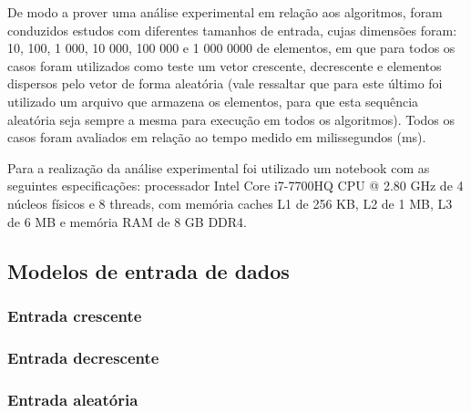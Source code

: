 \documentclass[conference]{IEEEtran}
\begin{document}
De modo a prover uma análise experimental em relação aos algoritmos, foram conduzidos estudos com diferentes tamanhos de entrada, cujas dimensões foram: 10, 100, 1 000, 10 000, 100 000 e 1 000 0000 de elementos, em que para todos os casos foram utilizados como teste um vetor crescente, decrescente e elementos dispersos pelo vetor de forma aleatória (vale ressaltar que para este último foi utilizado um arquivo que armazena os elementos, para que esta sequência aleatória seja sempre a mesma para execução em todos os algoritmos). Todos os casos foram avaliados em relação ao tempo medido em milissegundos (ms).

Para a realização da análise experimental foi utilizado um notebook com as seguintes especificações: processador Intel Core i7-7700HQ CPU @ 2.80 GHz de 4 núcleos físicos e 8 threads, com memória
caches L1 de 256 KB, L2 de 1 MB, L3 de 6 MB e memória
RAM de 8 GB DDR4.


\subsection{Modelos de entrada de dados}

\subsubsection{Entrada crescente}







\subsubsection{Entrada decrescente}


\subsubsection{Entrada aleatória}

\centering
{}
\end{document}
